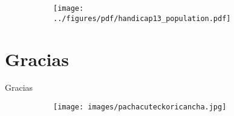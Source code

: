 \documentclass[shownotes]{beamer}
\begin{document}
\begin{frame}
  \begin{figure}[H]     
     \centering \normalsize
     \begin{subfigure}[b]{0.8\textwidth}
     \texttt{[image: ../figures/pdf/handicap13\_population.pdf]} 
     \end{subfigure}
  \end{figure}
\end{frame}


\section{Gracias}

\begin{frame}
 
 \begin{center}
  \Large Gracias
 \end{center}

 \begin{figure}[H]     
     \centering
     \begin{subfigure}[b]{0.45\textwidth}
       \texttt{[image: images/pachacuteckoricancha.jpg]} 
     \end{subfigure}
   \end{figure} 
  
\end{frame}
\end{document}
